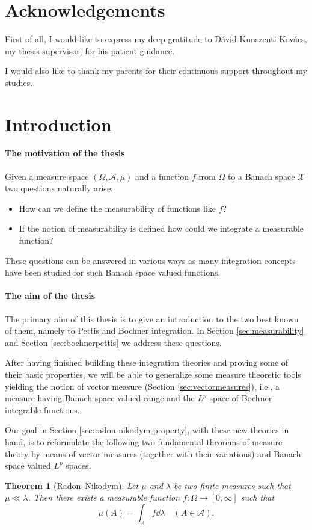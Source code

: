 \documentclass[a4paper, 12pt]{article}
\newtheorem{theo}[lem]{Theorem}
\begin{document}
\pagebreak
{}
\section*{Acknowledgements}
First of all, I would like to express my deep gratitude to Dávid Kunszenti-Kovács, my thesis supervisor, for his patient guidance.

I would also like to thank my parents for their continuous support throughout my studies.
\newpage
\tableofcontents
\newpage
{}
\section{Introduction}
\paragraph*{The motivation of the thesis} Given a measure space $(\Omega, \mathcal{A}, \mu)$ and a function $f$ from $\Omega$ to a Banach space $\mathcal{X}$ two questions naturally arise:
\begin{itemize}
\item How can we define the measurability of functions like $f$?
\item If the notion of measurability is defined how could we integrate a measurable function?
\end{itemize}
These questions can be answered in various ways as many integration concepts have been studied \cite{schwabik} for such Banach space valued functions. 

\paragraph*{The aim of the thesis} The primary aim of this thesis is to give an introduction to the two best known of them, namely to Pettis and Bochner integration. In Section \ref{sec:measurability} and Section \ref{sec:bochnerpettis} we address these questions.

After having finished building these integration theories and proving some of their basic properties, we will be able to generalize some measure theoretic tools yielding the notion of vector measure (Section \ref{sec:vectormeasures}), i.e., a measure having Banach space valued range and the $L^p$ space of Bochner integrable functions.

Our goal in Section \ref{sec:radon-nikodym-property}, with these new theories in hand, is to reformulate the following two fundamental theorems of measure theory by means of vector measures (together with their variations) and Banach space valued $L^p$ spaces.
\begin{theo}[Radon\---Nikodym] Let $\mu$ and $\lambda$ be two finite measures such that $\mu \ll \lambda$. Then there exists a measurable function $f \colon \Omega \to [0, \infty]$ such that
$$
\mu(A) = \int_{A} f \dd{\lambda} \quad (A \in \mathcal{A}).
$$
\end{theo}
\end{document}
